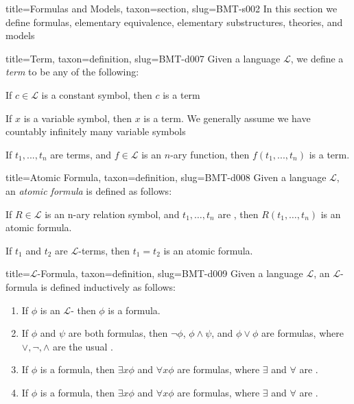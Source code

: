 \documentclass[a4paper]{article}
\begin{document}
  
  
\begin{tree}{title={Formulas and Models}, taxon={section}, slug={BMT-s002}}
In this section we define formulas, elementary equivalence, elementary substructures, theories, and models
\begin{tree}{title={Term}, taxon={definition}, slug={BMT-d007}}
Given a language \(\mathcal {L}\), we define a \emph{term} to be any of the following:\par{If \(c \in   \mathcal {L}\) is a constant symbol, then \(c\) is a term}\par{If \(x\) is a variable symbol, then \(x\) is a term. We generally assume we have countably infinitely many variable symbols}\par{If \(t_1,..., t_n\) are terms, and \(f \in   \mathcal {L}\) is an \(n\)-ary function, then \(f(t_1,..., t_n)\) is a term.}
\end{tree}

\begin{tree}{title={Atomic Formula}, taxon={definition}, slug={BMT-d008}}
Given a language \(\mathcal {L}\), an \emph{atomic formula} is defined as follows:\par{If \(R \in   \mathcal {L}\) is an n-ary relation symbol, and \(t_1, \dots , t_n\) are , then \(R(t_1, \dots , t_n)\) is an atomic formula.}\par{If \(t_1\) and \(t_2\) are \(\mathcal {L}\)-terms, then \(t_1 = t_2\) is an atomic formula. }
\end{tree}

\begin{tree}{title={\(\mathcal {L}\)-Formula}, taxon={definition}, slug={BMT-d009}}
Given a language \(\mathcal {L}\), an \(\mathcal {L}\)-formula is defined inductively as follows:\par{\begin{enumerate}
\item{
            If \(\phi\) is an \(\mathcal {L}\)- then \(\phi\) is a formula.
        }
        \item{
            If \(\phi\) and \(\psi\) are both formulas, then \(\neg \phi\), \(\phi   \land   \psi\), and 
            \(\phi \lor \phi\) are formulas, where \(\lor , \neg , \land\) are the usual .
        }
        \item{
            If \(\phi\) is a formula, then \(\exists  x  \phi\) and \(\forall  x  \phi\) are formulas, 
            where \(\exists\) and \(\forall\) are .
        }
        \item{
            If \(\phi\) is a formula, then \(\exists  x  \phi\) and \(\forall  x  \phi\) are formulas, 
            where \(\exists\) and \(\forall\) are .
        }
\end{enumerate}}
\end{tree}

\end{tree}
\end{document}
